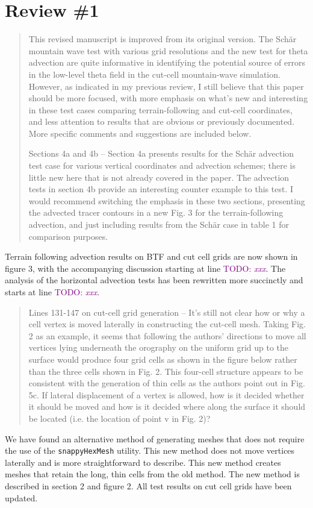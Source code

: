 \documentclass{article}
\newcommand{\TODO}[1]{\textcolor{purple}{TODO: \emph{#1}}}
\begin{document}
\section*{Review \#1}
\begin{quotation}
This revised manuscript is improved from its original version. The Sch\"{a}r mountain wave test with various grid resolutions and the new test for theta advection are quite informative in identifying the potential source of errors in the low-level theta field in the cut-cell mountain-wave simulation. However, as indicated in my previous review, I still believe that this paper should be more focused, with more emphasis on what's new and interesting in these test cases comparing terrain-following and cut-cell coordinates, and less attention to results that are obvious or previously documented. More specific comments and suggestions are included below. 

Sections 4a and 4b -- Section 4a presents results for the Sch\"{a}r advection test case for various vertical coordinates and advection schemes; there is little new here that is not already covered in the \citet{schaer2002} paper. The advection tests in section 4b provide an interesting counter example to this test. I would recommend switching the emphasis in these two sections, presenting the advected tracer contours in a new Fig. 3 for the terrain-following advection, and just including results from the Sch\"{a}r case in table 1 for comparison purposes.
\end{quotation}
Terrain following advection results on BTF and cut cell grids are now shown in figure 3, with the accompanying discussion starting at line \TODO{xxx}.  The analysis of the horizontal advection tests has been rewritten more succinctly and starts at line \TODO{xxx}.

\begin{quotation}
 Lines 131-147 on cut-cell grid generation -- It's still not clear how or why a cell vertex  is moved laterally in constructing the cut-cell mesh. Taking Fig. 2 as an example, it  seems that following the authors' directions to move all vertices lying underneath the  orography on the uniform grid up to the surface would produce four grid cells as  shown in the figure below rather than the three cells shown in Fig. 2. This four-cell structure appears to be consistent with the generation of thin cells as the authors  point out in Fig. 5c. If lateral displacement of a vertex is allowed, how is it decided  whether it should be moved and how is it decided where along the surface it should  be located (i.e. the location of point v in Fig. 2)?
\end{quotation}
We have found an alternative method of generating meshes that does not require the use of the \texttt{snappyHexMesh} utility.  This new method does not move vertices laterally and is more straightforward to describe.  This new method creates meshes that retain the long, thin cells from the old method.  The new method is described in section 2 and figure 2.  All test results on cut cell grids have been updated.
\end{document}
